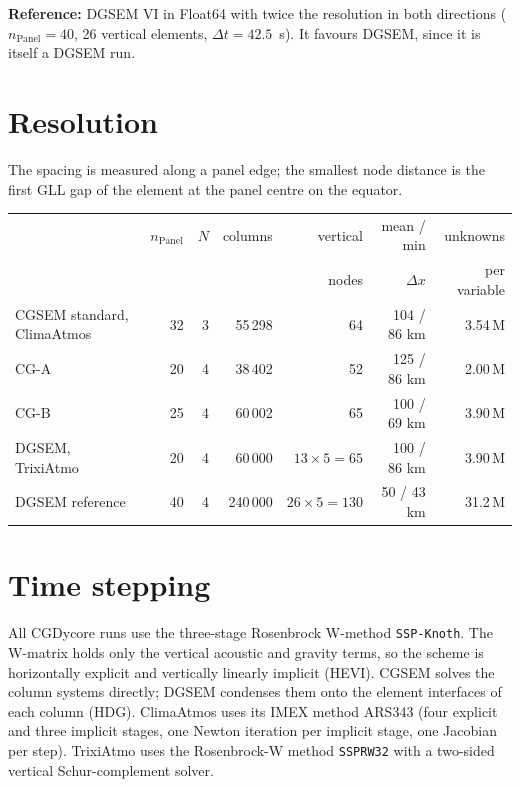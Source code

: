 \documentclass[11pt,a4paper]{article}
\newcommand{\code}[1]{\texttt{#1}}
\begin{document}
\noindent\textbf{Reference:} DGSEM VI in Float64 with twice the resolution
in both directions ($n_\text{Panel}=40$, 26 vertical elements,
$\Delta t=42.5$~s). It favours DGSEM, since it is itself a DGSEM run.

\section{Resolution}

The spacing is measured along a panel edge; the smallest node distance is
the first GLL gap of the element at the panel centre on the equator.

\begin{center}
\small\setlength{\tabcolsep}{4pt}
\begin{tabular}{lrrrrrr}
\toprule
 & $n_\text{Panel}$ & $N$ & columns & vertical & mean / min & unknowns \\
 & & & & nodes & $\Delta x$ & per variable \\
\midrule
CGSEM standard, ClimaAtmos & 32 & 3 & 55\,298 & 64 & 104 / 86 km & 3.54\,M \\
CG-A           & 20 & 4 & 38\,402 & 52 & 125 / 86 km & 2.00\,M \\
CG-B           & 25 & 4 & 60\,002 & 65 & 100 / 69 km & 3.90\,M \\
DGSEM, TrixiAtmo & 20 & 4 & 60\,000 & $13\times5=65$ & 100 / 86 km & 3.90\,M \\
DGSEM reference & 40 & 4 & 240\,000 & $26\times5=130$ & 50 / 43 km & 31.2\,M \\
\bottomrule
\end{tabular}
\end{center}

\section{Time stepping}

All CGDycore runs use the three-stage Rosenbrock W-method \code{SSP-Knoth}.
The W-matrix holds only the vertical acoustic and gravity terms, so the
scheme is horizontally explicit and vertically linearly implicit (HEVI).
CGSEM solves the column systems directly; DGSEM condenses them onto the
element interfaces of each column (HDG). ClimaAtmos uses its IMEX method
ARS343 (four explicit and three implicit stages, one Newton iteration per
implicit stage, one Jacobian per step). TrixiAtmo uses the Rosenbrock-W
method \code{SSPRW32} with a two-sided vertical Schur-complement solver.
\end{document}
